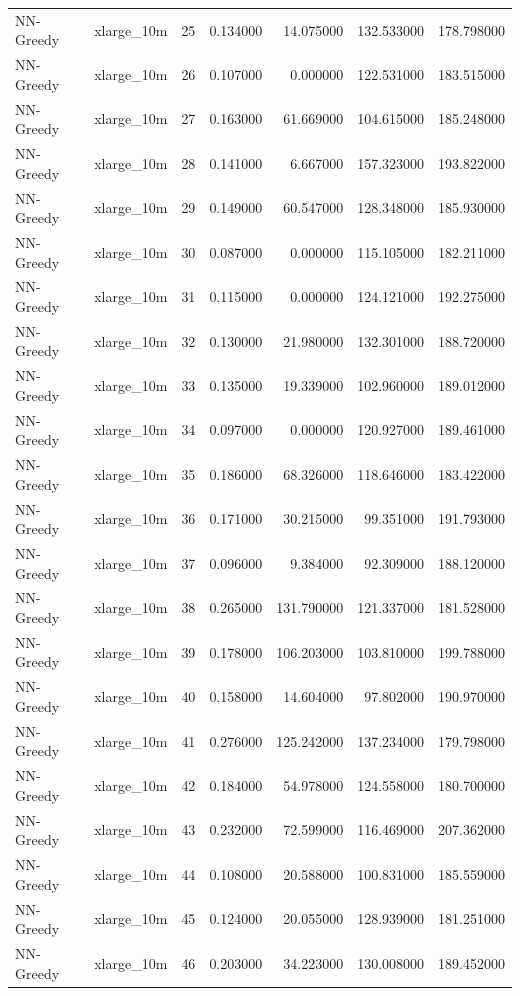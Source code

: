 \begin{tabular}{llrrrrr}
NN-Greedy & xlarge_10m & 25 & 0.134000 & 14.075000 & 132.533000 & 178.798000 \\
NN-Greedy & xlarge_10m & 26 & 0.107000 & 0.000000 & 122.531000 & 183.515000 \\
NN-Greedy & xlarge_10m & 27 & 0.163000 & 61.669000 & 104.615000 & 185.248000 \\
NN-Greedy & xlarge_10m & 28 & 0.141000 & 6.667000 & 157.323000 & 193.822000 \\
NN-Greedy & xlarge_10m & 29 & 0.149000 & 60.547000 & 128.348000 & 185.930000 \\
NN-Greedy & xlarge_10m & 30 & 0.087000 & 0.000000 & 115.105000 & 182.211000 \\
NN-Greedy & xlarge_10m & 31 & 0.115000 & 0.000000 & 124.121000 & 192.275000 \\
NN-Greedy & xlarge_10m & 32 & 0.130000 & 21.980000 & 132.301000 & 188.720000 \\
NN-Greedy & xlarge_10m & 33 & 0.135000 & 19.339000 & 102.960000 & 189.012000 \\
NN-Greedy & xlarge_10m & 34 & 0.097000 & 0.000000 & 120.927000 & 189.461000 \\
NN-Greedy & xlarge_10m & 35 & 0.186000 & 68.326000 & 118.646000 & 183.422000 \\
NN-Greedy & xlarge_10m & 36 & 0.171000 & 30.215000 & 99.351000 & 191.793000 \\
NN-Greedy & xlarge_10m & 37 & 0.096000 & 9.384000 & 92.309000 & 188.120000 \\
NN-Greedy & xlarge_10m & 38 & 0.265000 & 131.790000 & 121.337000 & 181.528000 \\
NN-Greedy & xlarge_10m & 39 & 0.178000 & 106.203000 & 103.810000 & 199.788000 \\
NN-Greedy & xlarge_10m & 40 & 0.158000 & 14.604000 & 97.802000 & 190.970000 \\
NN-Greedy & xlarge_10m & 41 & 0.276000 & 125.242000 & 137.234000 & 179.798000 \\
NN-Greedy & xlarge_10m & 42 & 0.184000 & 54.978000 & 124.558000 & 180.700000 \\
NN-Greedy & xlarge_10m & 43 & 0.232000 & 72.599000 & 116.469000 & 207.362000 \\
NN-Greedy & xlarge_10m & 44 & 0.108000 & 20.588000 & 100.831000 & 185.559000 \\
NN-Greedy & xlarge_10m & 45 & 0.124000 & 20.055000 & 128.939000 & 181.251000 \\
NN-Greedy & xlarge_10m & 46 & 0.203000 & 34.223000 & 130.008000 & 189.452000 \\

\end{tabular}
